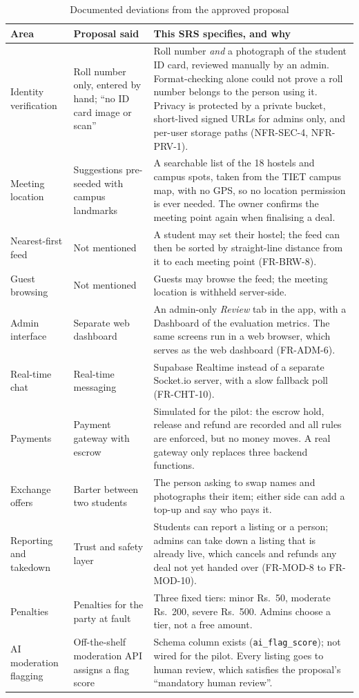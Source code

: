 \documentclass[11pt,a4paper]{scrreprt}
\begin{document}
\begin{longtable}{L{3.6cm} L{4.6cm} L{6.6cm}}
\caption{Documented deviations from the approved proposal}\label{tab:dev}\\
\toprule
\textbf{Area} & \textbf{Proposal said} & \textbf{This SRS specifies, and why}\\ \midrule\endhead
Identity verification & Roll number only, entered by hand; ``no ID card image or scan'' & Roll number \emph{and} a photograph of the student ID card, reviewed manually by an admin. Format-checking alone could not prove a roll number belongs to the person using it. Privacy is protected by a private bucket, short-lived signed URLs for admins only, and per-user storage paths (NFR-SEC-4, NFR-PRV-1).\\
Meeting location & Suggestions pre-seeded with campus landmarks & A searchable list of the 18 hostels and campus spots, taken from the TIET campus map, with no GPS, so no location permission is ever needed. The owner confirms the meeting point again when finalising a deal.\\
Nearest-first feed & Not mentioned & A student may set their hostel; the feed can then be sorted by straight-line distance from it to each meeting point (FR-BRW-8).\\
Guest browsing & Not mentioned & Guests may browse the feed; the meeting location is withheld server-side.\\
Admin interface & Separate web dashboard & An admin-only \emph{Review} tab in the app, with a Dashboard of the evaluation metrics. The same screens run in a web browser, which serves as the web dashboard (FR-ADM-6).\\
Real-time chat & Real-time messaging & Supabase Realtime instead of a separate Socket.io server, with a slow fallback poll (FR-CHT-10).\\
Payments & Payment gateway with escrow & Simulated for the pilot: the escrow hold, release and refund are recorded and all rules are enforced, but no money moves. A real gateway only replaces three backend functions.\\
Exchange offers & Barter between two students & The person asking to swap names and photographs their item; either side can add a top-up and say who pays it.\\
Reporting and takedown & Trust and safety layer & Students can report a listing or a person; admins can take down a listing that is already live, which cancels and refunds any deal not yet handed over (FR-MOD-8 to FR-MOD-10).\\
Penalties & Penalties for the party at fault & Three fixed tiers: minor Rs.~50, moderate Rs.~200, severe Rs.~500. Admins choose a tier, not a free amount.\\
AI moderation flagging & Off-the-shelf moderation API assigns a flag score & Schema column exists (\texttt{ai_flag_score}); not wired for the pilot. Every listing goes to human review, which satisfies the proposal's ``mandatory human review''.\\
\bottomrule
\end{longtable}
\end{document}
